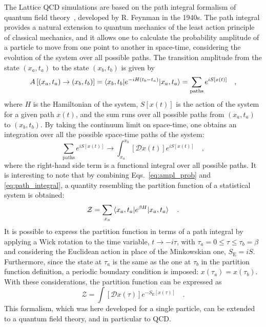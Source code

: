 The Lattice QCD simulations are based on the path integral formalism of quantum field theory~\cite{RevModPhys.20.367}, developed by R. Feynman in the 1940s. The path integral provides a natural extension to quantum mechanics of the least action principle of classical mechanics, and it allows one to calculate the probability amplitude of a particle to move from one point to another in space-time, considering the evolution of the system over all possible paths. The transition amplitude from the state $(x_a,t_a)$ to the state $(x_b,t_b)$ is given by
\begin{equation}\label{eq:ampl_prob}
  A \left[(x_a,t_a) \rightarrow (x_b,t_b) \right] = \braket{x_b,t_b | e^{-iH(t_b-t_a)} | x_a,t_a} = \sum_\mathrm{paths} e^{iS[x(t)]}\quad , 
\end{equation}
where $H$ is the Hamiltonian of the system, $S[x(t)]$ is the action of the system for a given path $x(t)$, and the sum runs over all possible paths from $(x_a,t_a)$ to $(x_b,t_b)$. By taking the continuum limit on space-time, one obtains an integration over all the possible space-time paths of the system:
\begin{equation}\label{eq:path_integral}
  \sum_\mathrm{paths} e^{iS[x(t)]} \rightarrow \int_{x_a}^{x_b} \left[\mathcal{D}x(t)\right] e^{iS[x(t)]}\quad ,
\end{equation}
where the right-hand side term is a functional integral over all possible paths. It is interesting to note that by combining Eqs.~\ref{eq:ampl_prob} and \ref{eq:path_integral}, a quantity resembling the partition function of a statistical system is obtained:
\begin{equation*}
  \mathcal{Z} = \sum_{x_a} \braket{x_a,t_a | e^{\beta H} | x_a,t_a}\quad .
\end{equation*}
It is possible to express the partition function in terms of a path integral by applying a Wick rotation to the time variable, $t \rightarrow -i\tau$, with $\tau_a=0\leq\tau\leq\tau_b=\beta$ and considering the Euclidean action in place of the Minkowskian one, $S_\mathrm{E}=iS$. Furthermore, since the state at $\tau_a$ is the same as the one at $\tau_b$ in the partition function definition, a periodic boundary condition is imposed: $x(\tau_a) = x(\tau_b)$. With these considerations, the partition function can be expressed as
\begin{equation*}
  \mathcal{Z} = \int \left[\mathcal{D}x(\tau)\right] e^{-S_\mathrm{E}[x(\tau)]}\quad .
\end{equation*}
This formalism, which was here developed for a single particle, can be extended to a quantum field theory, and in particular to QCD.

